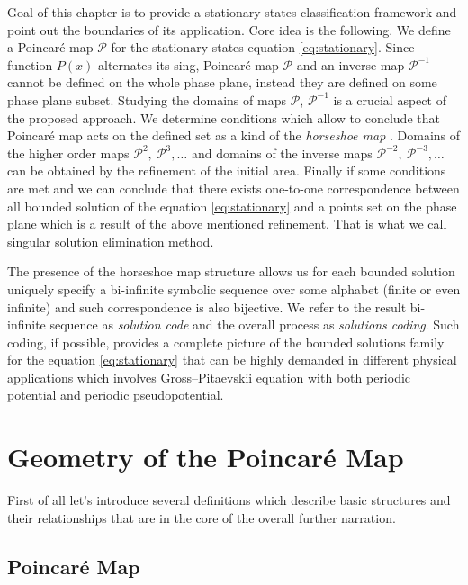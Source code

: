 Goal of this chapter is to provide a stationary states classification framework and point out the boundaries of its application.
Core idea is the following.
We define a Poincar\'e map $\mathcal{P}$ for the stationary states equation \eqref{eq:stationary}.
Since function $P(x)$ alternates its sing, Poincar\'e map $\mathcal{P}$ and an inverse map $\mathcal{P}^{-1}$ cannot be defined on the whole phase plane, instead they are defined on some phase plane subset.
Studying the domains of maps $\mathcal{P}$, $\mathcal{P}^{-1}$ is a crucial aspect of the proposed approach.
We determine conditions which allow to conclude that Poincar\'e map acts on the defined set as a kind of the {\it horseshoe map} \cite[Chapter 5]{GuekenheimerHolmes}.
Domains of the higher order maps $\mathcal{P}^2,~\mathcal{P}^3, \dots$ and domains of the inverse maps $\mathcal{P}^{-2},~\mathcal{P}^{-3}, \dots$ can be obtained by the refinement of the initial area.
Finally if some conditions are met and we can conclude that there exists one-to-one correspondence between all bounded solution of the equation \eqref{eq:stationary} and a points set on the phase plane which is a result of the above mentioned refinement.
That is what we call singular solution elimination method.

The presence of the horseshoe map structure allows us for each bounded solution uniquely specify a bi-infinite symbolic sequence over some alphabet (finite or even infinite) and such correspondence is also bijective.
We refer to the result bi-infinite sequence as {\it solution code} and the overall process as {\it solutions coding}.
Such coding, if possible, provides a complete picture of the bounded solutions family for the equation \eqref{eq:stationary} that can be highly demanded in different physical applications which involves Gross--Pitaevskii equation with both periodic potential and periodic pseudopotential.

\section{Geometry of the Poincar\'e Map}

First of all let's introduce several definitions which describe basic structures and their relationships that are in the core of the overall further narration.

\subsection{Poincar\'e Map}

